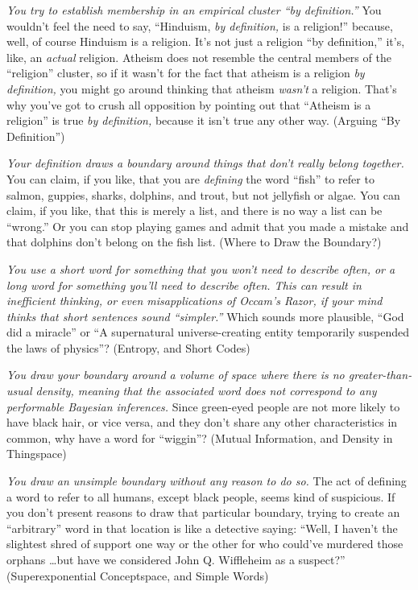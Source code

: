 {
 \textit{You try to establish membership in an empirical cluster
``by definition.''} You
wouldn't feel the need to say,
``Hinduism, \textit{by definition,} is a
religion!'' because, well, of course Hinduism is a
religion. It's not just a religion
``by definition,''
it's, like, an \textit{actual} religion. Atheism does
not resemble the central members of the
``religion'' cluster, so if it
wasn't for the fact that atheism is a religion
\textit{by definition,} you might go around thinking that atheism
\textit{wasn't} a religion. That's why
you've got to crush all opposition by pointing out that
``Atheism is a religion'' is true
\textit{by definition,} because it isn't true any other
way. (Arguing ``By Definition'')}

{
 \textit{Your definition draws a boundary around things that
don't really belong together.} You can claim, if you
like, that you are \textit{defining} the word
``fish'' to refer to salmon,
guppies, sharks, dolphins, and trout, but not jellyfish or algae. You
can claim, if you like, that this is merely a list, and there is no way
a list can be ``wrong.'' Or you can
stop playing games and admit that you made a mistake and that dolphins
don't belong on the fish list. (Where to Draw the
Boundary?)}

{
 \textit{You use a short word for something that you
won't need to describe often, or a long word for
something you'll need to describe often. This can
result in inefficient thinking, or even misapplications of
Occam's Razor, if your mind thinks that short sentences
sound ``simpler.''} Which sounds
more plausible, ``God did a
miracle'' or ``A supernatural
universe-creating entity temporarily suspended the laws of
physics''? (Entropy, and Short Codes)}

{
 \textit{You draw your boundary around a volume of space where
there is no greater-than-usual density, meaning that the associated
word does not correspond to any performable Bayesian inferences.} Since
green-eyed people are not more likely to have black hair, or vice
versa, and they don't share any other characteristics
in common, why have a word for
``wiggin''? (Mutual Information, and
Density in Thingspace)}

{
 \textit{You draw an unsimple boundary without any reason to do
so.} The act of defining a word to refer to all humans, except black
people, seems kind of suspicious. If you don't present
reasons to draw that particular boundary, trying to create an
``arbitrary'' word in that location
is like a detective saying: ``Well, I
haven't the slightest shred of support one way or the
other for who could've murdered those orphans \ldots but
have we considered John Q. Wiffleheim as a suspect?''
(Superexponential Conceptspace, and Simple Words)}

